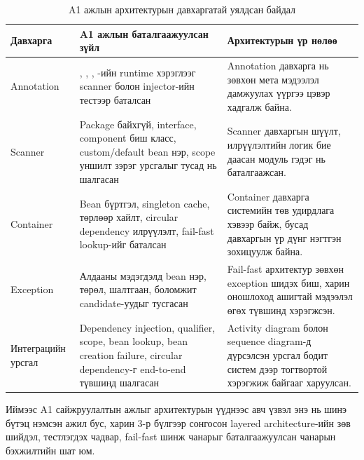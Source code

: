 \renewcommand{\arraystretch}{1.25}
\scriptsize
\setlength{\tabcolsep}{3pt}
\begin{table}[H]
\centering
\caption{A1 ажлын архитектурын давхаргатай уялдсан байдал}
\label{tab:a1-architecture-alignment-fixed}
\begin{tabularx}{\textwidth}{|L{0.15\textwidth}|Y|Y|}
\hline
\textbf{Давхарга} & \textbf{A1 ажлын баталгаажуулсан зүйл} & \textbf{Архитектурын үр нөлөө} \\ \hline

Annotation &
, , , -ийн runtime хэрэглээг scanner болон injector-ийн тестээр баталсан &
Annotation давхарга нь зөвхөн мета мэдээлэл дамжуулах үүргээ цэвэр хадгалж байна. \\ \hline

Scanner &
Package байхгүй, interface, component биш класс, custom/default bean нэр, scope уншилт зэрэг урсгалыг тусад нь шалгасан &
Scanner давхаргын шүүлт, илрүүлэлтийн логик бие даасан модуль гэдэг нь баталгаажсан. \\ \hline

Container &
Bean бүртгэл, singleton cache, төрлөөр хайлт, circular dependency илрүүлэлт, fail-fast lookup-ийг баталсан &
Container давхарга системийн төв удирдлага хэвээр байж, бусад давхаргын үр дүнг нэгтгэн зохицуулж байна. \\ \hline

Exception &
Алдааны мэдэгдэлд bean нэр, төрөл, шалтгаан, боломжит candidate-уудыг тусгасан &
Fail-fast архитектур зөвхөн exception шидэх биш, харин оношлоход ашигтай мэдээлэл өгөх түвшинд хэрэгжсэн. \\ \hline

Интеграцийн урсгал &
Dependency injection, qualifier, scope, bean lookup, bean creation failure, circular dependency-г end-to-end түвшинд шалгасан &
Activity diagram болон sequence diagram-д дүрсэлсэн урсгал бодит систем дээр тогтвортой хэрэгжиж байгааг харуулсан. \\ \hline

\end{tabularx}
\end{table}
\normalsize
\renewcommand{\arraystretch}{1}


Иймээс A1 сайжруулалтын ажлыг архитектурын үүднээс авч үзвэл энэ нь шинэ бүтэц нэмсэн ажил бус, харин 3-р бүлгээр сонгосон layered architecture-ийн зөв шийдэл, тестлэгдэх чадвар, fail-fast шинж чанарыг баталгаажуулсан чанарын бэхжилтийн шат юм.

